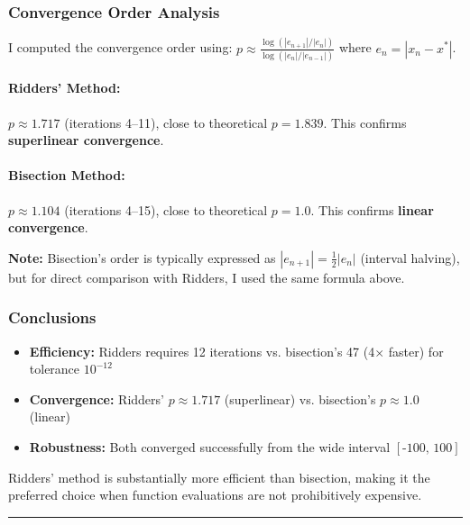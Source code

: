 \clearpage

\subsubsection*{Convergence Order Analysis}

I computed the convergence order using: $p \approx \frac{\log(|e_{n+1}|/|e_n|)}{\log(|e_n|/|e_{n-1}|)}$ where $e_n = |x_n - x^*|$.

\paragraph{Ridders' Method:} $p \approx 1.717$ (iterations 4--11), close to theoretical $p = 1.839$. This confirms \textbf{superlinear convergence}.

\paragraph{Bisection Method:} $p \approx 1.104$ (iterations 4--15), close to theoretical $p = 1.0$. This confirms \textbf{linear convergence}. 

\textbf{Note:} Bisection's order is typically expressed as $|e_{n+1}| = \frac{1}{2}|e_n|$ (interval halving), but for direct comparison with Ridders, I used the same formula above.

\subsubsection*{Conclusions}

\begin{itemize}
    \item \textbf{Efficiency:} Ridders requires 12 iterations vs. bisection's 47 (4$\times$ faster) for tolerance $10^{-12}$
    \item \textbf{Convergence:} Ridders' $p \approx 1.717$ (superlinear) vs. bisection's $p \approx 1.0$ (linear)
    \item \textbf{Robustness:} Both converged successfully from the wide interval $[\text{-}100,\,100]$
\end{itemize}

Ridders' method is substantially more efficient than bisection, making it the preferred choice when function evaluations are not prohibitively expensive.

\vspace{2em}
\noindent\rule{\textwidth}{0.4pt}
